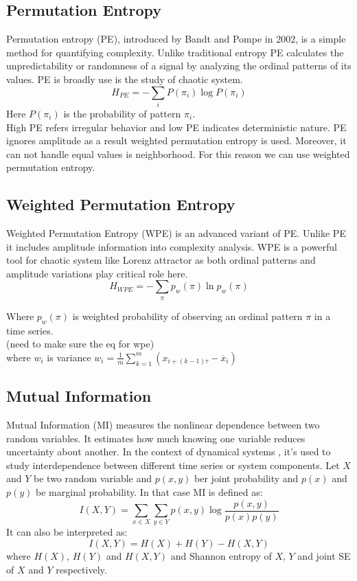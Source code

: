 \documentclass[%
reprint,
amsmath,amssymb,
aps,
floatfix,
]{revtex4-2}
\begin{document}
	\subsection{Permutation Entropy}
	Permutation entropy (PE), introduced by Bandt and Pompe in 2002, is a simple method for quantifying complexity. Unlike traditional entropy PE calculates the unpredictability or randomness of a signal by analyzing the ordinal patterns of its values. PE is broadly use is the study of chaotic system.
	\begin{equation}
		H_{PE} = -\sum_{i} P(\pi_i) \log P(\pi_i)
	\end{equation}
	Here $P(\pi_i)$ is the probability of pattern $\pi_i$.\\
	High PE refers irregular behavior and low PE indicates deterministic nature. PE ignores amplitude as a result weighted permutation entropy is used. Moreover, it can not handle equal values is neighborhood. For this reason we can use weighted permutation entropy.
	\subsection{Weighted Permutation Entropy}
	Weighted Permutation Entropy\cite{fadlallah2013weighted} (WPE) is an advanced variant of PE. Unlike PE it includes amplitude information into complexity analysis. WPE is a powerful tool for chaotic system like Lorenz attractor as both ordinal patterns and amplitude variations play critical role here.
	\begin{equation} 
		H_{WPE} = -\sum_{\pi} p_w(\pi) \ln p_w (\pi)
	\end{equation} 
	
	Where $p_w(\pi)$ is weighted probability of observing an ordinal pattern $\pi$ in a time series.\\
	(need to make sure the eq for wpe)\\
	where $w_i$ is variance $w_i = \frac{1}{m} \sum_{k=1}^{m} (x_{i+(k-1)\tau} - \overline{x}_i) $
	\subsection{Mutual Information}
	Mutual Information (MI) measures the nonlinear dependence between two random variables. It estimates how much knowing one variable reduces uncertainty about another. In the context of dynamical systems , it's used to study interdependence between different time series or system components. Let $X$ and $Y$ be two random variable and $p(x,y)$ ber joint probability and $p(x)$ and $p(y)$ be marginal probability. In that case MI is defined as:
	\begin{equation}
		I(X,Y) = \sum_{x\in X} \sum_{y\in Y} p(x,y) \log \frac{p(x,y)}{p(x)p(y)}
	\end{equation}
	It can also be interpreted as:
	\begin{equation}
		I(X,Y) = H(X) + H(Y) - H(X,Y)
	\end{equation}
	where $H(X)$, $H(Y)$ and $H(X,Y)$ and Shannon entropy of $X$, $Y$ and joint SE of $X$ and $Y$ respectively.
\end{document}
